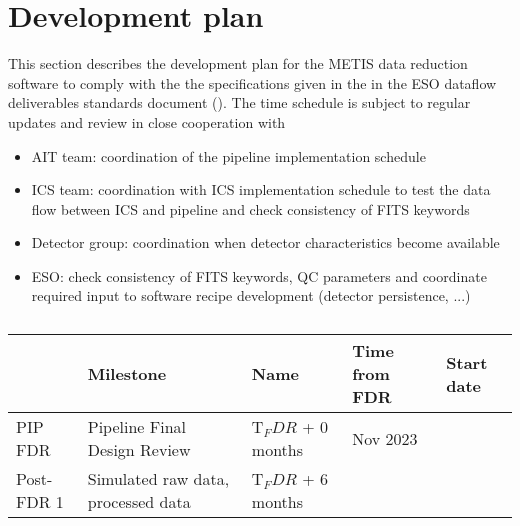 \clearpage
\section{Development plan}\label{sec:development_plan}

This section describes the development plan for the METIS data reduction software to comply with the the specifications given in the in the ESO dataflow deliverables standards document (\cite{1618}). The time schedule is subject to regular updates and review in close cooperation with

\begin{itemize}
    \item AIT team: coordination of the pipeline implementation schedule
    \item ICS team: coordination with ICS implementation schedule to test the data flow between ICS and pipeline and check consistency of FITS keywords
    \item Detector group: coordination when detector characteristics become available
    \item ESO: check consistency of FITS keywords, QC parameters and coordinate required input to software recipe development (detector persistence, ...)
\end{itemize}

\begin{table}
    \caption[Milestones of the METIS pipeline software development schedule starting at FDR]{}
  \label{tab:calibrations_per_mode}
  \centering\scriptsize
  \begin{tabularx}{\textwidth}{llll}
    \hline
                           & Milestone & Name & Time from FDR & Start date \\
    \hline\hline
    PIP FDR          & Pipeline Final Design Review & T$_FDR$ + 0 months & Nov 2023 \\
    Post-FDR 1       & Simulated raw data, processed data &  T$_FDR$ + 6 months &

    \hline
  \end{tabularx}
\end{table}